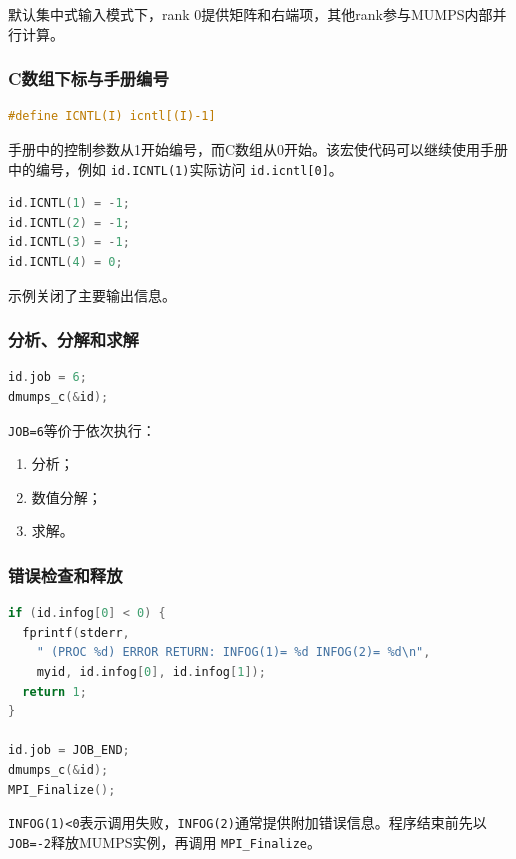 默认集中式输入模式下，rank 0提供矩阵和右端项，其他rank参与MUMPS内部并行计算。

\subsubsection{C数组下标与手册编号}

\begin{lstlisting}[language=C]
#define ICNTL(I) icntl[(I)-1]
\end{lstlisting}

手册中的控制参数从1开始编号，而C数组从0开始。该宏使代码可以继续使用手册中的编号，例如 \texttt{id.ICNTL(1)}实际访问 \texttt{id.icntl[0]}。

\begin{lstlisting}[language=C]
id.ICNTL(1) = -1;
id.ICNTL(2) = -1;
id.ICNTL(3) = -1;
id.ICNTL(4) = 0;
\end{lstlisting}

示例关闭了主要输出信息。

\subsubsection{分析、分解和求解}

\begin{lstlisting}[language=C]
id.job = 6;
dmumps_c(&id);
\end{lstlisting}

\texttt{JOB=6}等价于依次执行：

\begin{enumerate}
  \item 分析；
  \item 数值分解；
  \item 求解。
\end{enumerate}

\subsubsection{错误检查和释放}

\begin{lstlisting}[language=C]
if (id.infog[0] < 0) {
  fprintf(stderr,
    " (PROC %d) ERROR RETURN: INFOG(1)= %d INFOG(2)= %d\n",
    myid, id.infog[0], id.infog[1]);
  return 1;
}

id.job = JOB_END;
dmumps_c(&id);
MPI_Finalize();
\end{lstlisting}

\texttt{INFOG(1)\textless{}0}表示调用失败，\texttt{INFOG(2)}通常提供附加错误信息。程序结束前先以 \texttt{JOB=-2}释放MUMPS实例，再调用 \texttt{MPI\_Finalize}。


